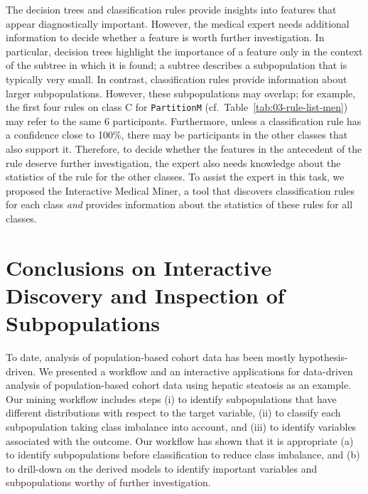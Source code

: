 \documentclass[
  oneside]{book}
\begin{document}
The decision trees and classification rules provide insights into features that appear diagnostically important.
However, the medical expert needs additional information to decide whether a feature is worth further investigation.
In particular, decision trees highlight the importance of a feature only in the context of the subtree in which it is found; a subtree describes a subpopulation that is typically very small.
In contrast, classification rules provide information about larger subpopulations.
However, these subpopulations may overlap; for example, the first four rules on class C for \texttt{PartitionM} (cf.~Table~\ref{tab:03-rule-list-men}) may refer to the same 6 participants.
Furthermore, unless a classification rule has a confidence close to 100\%, there may be participants in the other classes that also support it.
Therefore, to decide whether the features in the antecedent of the rule deserve further investigation, the expert also needs knowledge about the statistics of the rule for the other classes.
To assist the expert in this task, we proposed the Interactive Medical Miner, a tool that discovers classification rules for each class \emph{and} provides information about the statistics of these rules for all classes.

\hypertarget{imm-conclusions}{%
\section{Conclusions on Interactive Discovery and Inspection of Subpopulations}\label{imm-conclusions}}

To date, analysis of population-based cohort data has been mostly hypothesis-driven.
We presented a workflow and an interactive applications for data-driven analysis of population-based cohort data using hepatic steatosis as an example.
Our mining workflow includes steps (i) to identify subpopulations that have different distributions with respect to the target variable, (ii) to classify each subpopulation taking class imbalance into account, and (iii) to identify variables associated with the outcome.
Our workflow has shown that it is appropriate (a) to identify subpopulations before classification to reduce class imbalance, and (b) to drill-down on the derived models to identify important variables and subpopulations worthy of further investigation.
\end{document}
